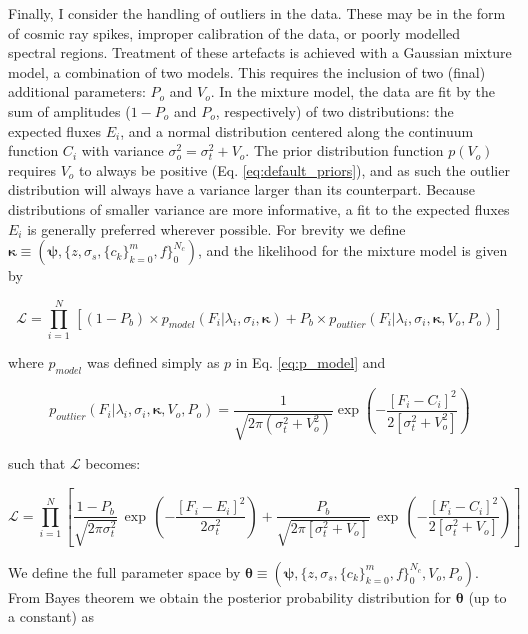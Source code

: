 \documentclass{aastex}
\begin{document}
Finally, I consider the handling of outliers in the data. These may be in the form of cosmic ray spikes, improper calibration of the data, or poorly modelled spectral regions. Treatment of these artefacts is achieved with a Gaussian mixture model, a combination of two models. This requires the inclusion of two (final) additional parameters: $P_o$ and $V_o$. In the mixture model, the data are fit by the sum of amplitudes ($1 - P_o$ and $P_o$, respectively) of two distributions: the expected fluxes $E_i$, and a normal distribution centered along the continuum function $C_i$ with variance $\sigma_{o}^2 = \sigma_{t}^2 + V_{o}$. The prior distribution function $p\left(V_o\right)$ requires $V_{o}$ to always be positive (Eq. \ref{eq:default_priors}), and as such the outlier distribution will always have a variance larger than its counterpart. Because distributions of smaller variance are more informative, a fit to the expected fluxes $E_{i}$ is generally preferred wherever possible. For brevity we define $\bm{\kappa} \equiv (\bm{\psi},\{z,\sigma_s,\{c_k\}_{k=0}^{m},f\}_{0}^{N_{c}})$, and the likelihood for the mixture model is given by
 
 \begin{equation}
\mathcal{L} = \prod_{i=1}^{N}\,\left[\left(1 - P_{b}\right)\times{}p_{model}\left(F_i|\lambda_i,\sigma_{i},\bm{\kappa}\right) + P_{b}\times{}p_{outlier}\left(F_i|\lambda_i,\sigma_i,\bm{\kappa},V_{o},P_o\right)\right]
\end{equation}
 
\noindent{}where $p_{model}$ was defined simply as $p$ in Eq. \ref{eq:p_model} and 

\begin{equation}
p_{outlier}\left(F_i|\lambda_i,\sigma_i,\bm{\kappa},V_{o},P_o\right) = \frac{1}{\sqrt{2\pi\left(\sigma_{t}^2 + V_{o}^2\right)}} \exp\left(-\frac{[F_i - C_i]^2}{2\left[\sigma_{t}^2 + V_{o}^2\right]}\right)
\end{equation}

\noindent{}such that $\mathcal{L}$ becomes:

\begin{equation}
\mathcal{L} = \prod_{i=1}^{N} \left[ \frac{1-P_b}{\sqrt{2\pi\sigma_{t}^2}}\,\exp\,\left(-\frac{[F_i - E_i]^2}{2\sigma_{t}^{2}}\right) + \frac{P_b}{\sqrt{2\pi\left[\sigma_t^2 + V_o\right]}}\,\exp\,\left(-\frac{[F_i - C_i]^2}{2\left[\sigma_t^{2} + V_o\right]}\right)\right]
\label{eq:full_likelihood}
\end{equation}

We define the full parameter space by $\bm{\theta} \equiv \left(\bm{\psi},\{z,\sigma_s,\{c_k\}_{k=0}^{m},f\}_{0}^{N_{c}},V_o,P_o\right)$. From Bayes theorem we obtain the posterior probability distribution for $\bm{\theta}$ (up to a constant) as
\end{document}
